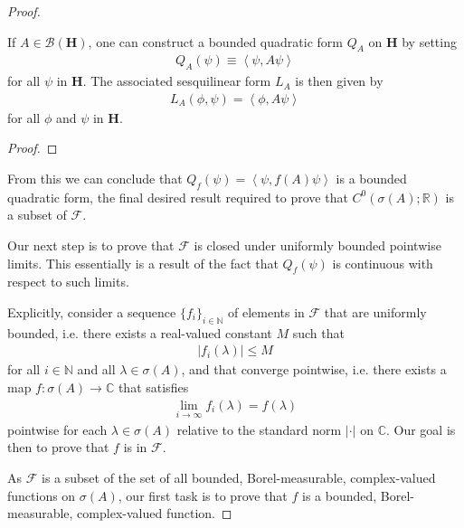 \begin{proof}
\begin{proposition}
    \label{prpstn:hall-a.62}
    \leanok
    If $A \in \mathcal{B}(\mathbf{H})$, one can construct a bounded quadratic form $Q_A$ on $\mathbf{H}$ by setting
    \begin{align}
        Q_A(\psi) \equiv \left< \psi, A\psi \right>
    \end{align}
    for all $\psi$ in $\mathbf{H}$. The associated sesquilinear form $L_A$ is then given by
    \begin{align}
        L_A(\phi, \psi) = \left< \phi, A\psi \right>
    \end{align}
    for all $\phi$ and $\psi$ in $\mathbf{H}$.
\end{proposition}
\begin{proof}
\leanok
\end{proof}

From this we can conclude that $Q_f(\psi) = \left< \psi, f(A)\psi \right>$ is a bounded quadratic form, the final desired result required to prove that $C^0(\sigma(A); \mathbb{R})$ is a subset of $\mathcal{F}$.

Our next step is to prove that $\mathcal{F}$ is closed under uniformly bounded pointwise limits. This essentially is a result of the fact that $Q_f(\psi)$ is continuous with respect to such limits.

Explicitly, consider a sequence $\{ f_i \}_{i \in \mathbb{N}}$ of elements in $\mathcal{F}$ that are uniformly bounded, i.e. there exists a real-valued constant $M$ such that
\begin{align}
    \lvert f_i(\lambda) \rvert \le M
\end{align}
for all $i \in \mathbb{N}$ and all $\lambda \in \sigma(A)$, and that converge pointwise, i.e. there exists a map $f : \sigma(A) \rightarrow \mathbb{C}$ that satisfies
\begin{align}
    \lim\limits_{i \rightarrow \infty} f_i(\lambda) = f(\lambda)
\end{align}
pointwise for each $\lambda \in \sigma(A)$ relative to the standard norm $\lvert \cdot \rvert$ on $\mathbb{C}$. Our goal is then to prove that $f$ is in $\mathcal{F}$.

As $\mathcal{F}$ is a subset of the set of all bounded, Borel-measurable, complex-valued functions on $\sigma(A)$, our first task is to prove that $f$ is a bounded, Borel-measurable, complex-valued function.


\end{proof}

